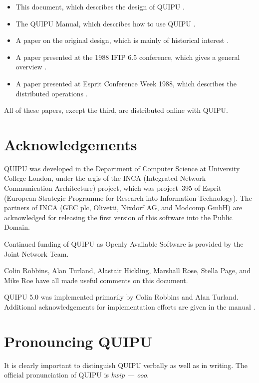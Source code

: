 \begin {itemize}
\item This document, which describes the design of QUIPU \cite{QUIPU.Design}.

\item The QUIPU Manual, which describes how to use QUIPU \cite{QUIPU.Manual}.

\item A paper on the original design, which is mainly of historical interest
\cite{ECW87.INCA}.

\item A paper presented at the 1988 IFIP 6.5 conference, which gives a
general overview \cite{QUIPU.IFIP}.

\item A paper presented at Esprit Conference Week 1988, which describes the
distributed operations \cite{QUIPU.Distributed}.
\end {itemize}

All of these papers, except the third, are distributed online with QUIPU.

\section {Acknowledgements}

QUIPU was developed in the Department of Computer Science at University
College London, under the {\ae}gis of the INCA (Integrated Network
Communication Architecture) project, which was project~395 
of Esprit  (European Strategic Programme for Research into
Information Technology). 
The partners of INCA  (GEC plc, Olivetti,
Nixdorf AG, and Modcomp GmbH) are acknowledged for releasing the first
version of this
software into the Public Domain.

Continued funding of QUIPU as Openly Available Software is provided by the
Joint Network Team.

Colin Robbins, Alan Turland, Alastair Hickling, Marshall Rose, Stella Page,
and Mike Roe have all made useful comments on this document.   

QUIPU 5.0 was implemented
primarily by Colin Robbins and Alan Turland.  Additional acknowledgements
for implementation efforts 
are given in the manual \cite{QUIPU.Manual}.

\section {Pronouncing QUIPU}

It is clearly important to distinguish QUIPU verbally as well as in writing.
The official pronunciation of QUIPU is {\em kwip --- ooo}.


